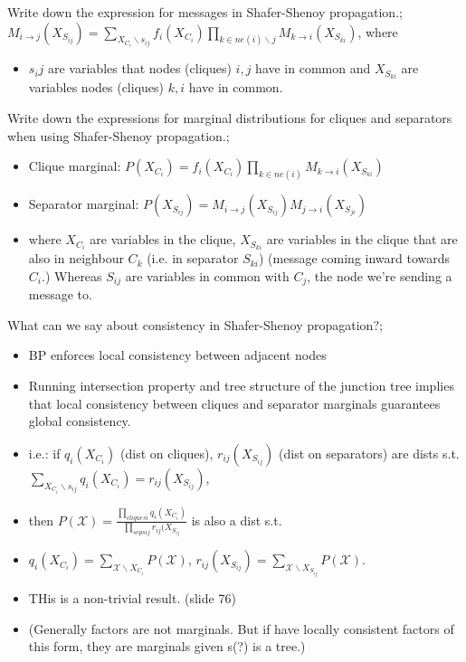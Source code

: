 \documentclass{article}
\begin{document}
Write down the expression for messages in Shafer-Shenoy propagation.; $M_{i\rightarrow j}(X_{S_{ij}})=\sum_{X_{C_i}\backslash s_{ij}}f_i(X_{C_i})\prod_{k\in ne(i)\backslash j}M_{k\rightarrow i}(X_{S_{ki}})$, where \begin{itemize}
    \item $s_ij$ are variables that nodes (cliques) $i, j$ have in common and
    $X_{S_{ki}}$ are variables nodes (cliques) $k, i$ have in common.
\end{itemize}

Write down the expressions for marginal distributions for cliques and separators when using Shafer-Shenoy propagation.; \begin{itemize}
    \item Clique marginal: $P(X_{C_i})=f_i(X_{C_i})\prod_{k\in ne(i)}M_{k\rightarrow i}(X_{S_{ki}})$
    \item Separator marginal: $P(X_{S_{ij}})=M_{i\rightarrow j}(X_{S_{ij}})M_{j\rightarrow i}(X_{S_{ji}})$
    \item where $X_{C_i}$ are variables in the clique, $X_{S_{ki}}$ are variables in the clique that are also in neighbour $C_k$ (i.e. in separator $S_{ki}$) (message coming inward towards $C_i$.) Whereas $S_{ij}$ are variables in common with $C_j$, the node we're sending a message to.
\end{itemize}

What can we say about consistency in Shafer-Shenoy propagation?; \begin{itemize}
    \item BP enforces local consistency between adjacent nodes
    \item Running intersection property and tree structure of the junction tree implies that local consistency between cliques and separator marginals guarantees global consistency.
    \item i.e.: if $q_i(X_{C_i})$ (dist on cliques), $r_{ij}(X_{S_{ij}})$ (dist on separators) are dists s.t. $\sum_{X_{C_i}\backslash s_{ij}}q_i(X_{C_i})=r_{ij}(X_{S_{ij}})$,
    \item then $P(\mathcal{X})=\frac{\prod_{cliques i}q_i(X_{C_i})}{\prod_{seps ij}r_{ij}(X_{S_{ij}}}$ is also a dist s.t.
    \item $q_i(X_{C_i})=\sum_{\mathcal{X}\backslash X_{C_i}}P(\mathcal{X})$, 
    $r_{ij}(X_{S_{ij}})=\sum_{\mathcal{X}\backslash X_{S_{ij}}}P(\mathcal{X})$.
    \item THis is a non-trivial result. (slide 76)
    \item (Generally factors are not marginals. But if have locally consistent factors of this form, they are marginals given s(?) is a tree.)
\end{itemize}
\end{document}
